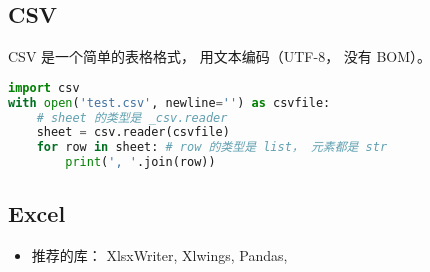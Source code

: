
\begin{issues}
\issueDraft
\end{issues}

\subsection{CSV}
CSV 是一个简单的表格格式， 用文本编码（UTF-8， 没有 BOM）。
\begin{lstlisting}[language=python]
import csv
with open('test.csv', newline='') as csvfile:
    # sheet 的类型是 _csv.reader
    sheet = csv.reader(csvfile)
    for row in sheet: # row 的类型是 list， 元素都是 str
        print(', '.join(row))
\end{lstlisting}

\subsection{Excel}
\begin{itemize}
\item 推荐的库： XlsxWriter, Xlwings, Pandas, 
\end{itemize}
